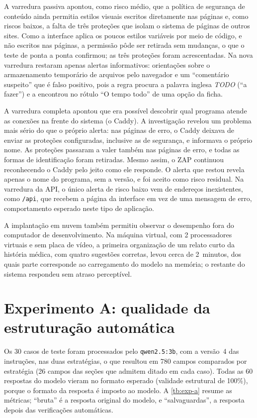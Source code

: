 A varredura passiva apontou, como risco médio, que a política de segurança de conteúdo ainda permitia estilos visuais escritos diretamente nas páginas e, como riscos baixos, a falta de três proteções que isolam o sistema de páginas de outros sites. Como a interface aplica os poucos estilos variáveis por meio de código, e não escritos nas páginas, a permissão pôde ser retirada sem mudanças, o que o teste de ponta a ponta confirmou; as três proteções foram acrescentadas. Na nova varredura restaram apenas alertas informativos: orientações sobre o armazenamento temporário de arquivos pelo navegador e um ``comentário suspeito'' que é falso positivo, pois a regra procura a palavra inglesa \textit{TODO} (``a fazer'') e a encontrou no rótulo ``O tempo todo'' de uma opção da ficha.

A varredura completa apontou que era possível descobrir qual programa atende as conexões na frente do sistema (o Caddy). A investigação revelou um problema mais sério do que o próprio alerta: nas páginas de erro, o Caddy deixava de enviar as proteções configuradas, inclusive as de segurança, e informava o próprio nome. As proteções passaram a valer também nas páginas de erro, e todas as formas de identificação foram retiradas. Mesmo assim, o ZAP continuou reconhecendo o Caddy pelo jeito como ele responde. O alerta que restou revela apenas o nome do programa, sem a versão, e foi aceito como risco residual. Na varredura da API, o único alerta de risco baixo vem de endereços inexistentes, como \texttt{/api}, que recebem a página da interface em vez de uma mensagem de erro, comportamento esperado neste tipo de aplicação.

A implantação em nuvem também permitiu observar o desempenho fora do computador de desenvolvimento. Na máquina virtual, com 2 processadores virtuais e sem placa de vídeo, a primeira organização de um relato curto da história médica, com quatro sugestões corretas, levou cerca de 2~minutos, dos quais parte corresponde ao carregamento do modelo na memória; o restante do sistema respondeu sem atraso perceptível.

\section{Experimento A: qualidade da estruturação automática}
\label{sec:res-exp-a}

Os 30 casos de teste foram processados pelo \texttt{qwen2.5:3b}, com a versão~4 das instruções, nas duas estratégias, o que resultou em 780 campos comparados por estratégia (26 campos das seções que admitem ditado em cada caso). Todas as 60 respostas do modelo vieram no formato esperado (validade estrutural de 100\%), porque o formato da resposta é imposto ao modelo. A \autoref{tb:exp-a} resume as métricas; ``bruta'' é a resposta original do modelo, e ``salvaguardas'', a resposta depois das verificações automáticas.


